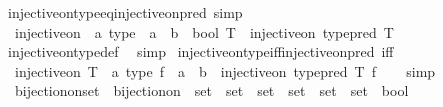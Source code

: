 \begin{isabellebody}
\isamarkupfalse%
\ injective{\isacharunderscore}{\kern0pt}on{\isacharunderscore}{\kern0pt}type{\isacharunderscore}{\kern0pt}eq{\isacharunderscore}{\kern0pt}injective{\isacharunderscore}{\kern0pt}on{\isacharunderscore}{\kern0pt}pred\ {\isacharbrackleft}{\kern0pt}simp{\isacharbrackright}{\kern0pt}{\isacharcolon}{\kern0pt}\isanewline
\ \ {\isachardoublequoteopen}{\isacharparenleft}{\kern0pt}injective{\isacharunderscore}{\kern0pt}on\ {\isacharcolon}{\kern0pt}{\isacharcolon}{\kern0pt}\ {\isacharprime}{\kern0pt}a\ type\ {\isasymRightarrow}\ {\isacharparenleft}{\kern0pt}{\isacharprime}{\kern0pt}a\ {\isasymRightarrow}\ {\isacharprime}{\kern0pt}b{\isacharparenright}{\kern0pt}\ {\isasymRightarrow}\ bool{\isacharparenright}{\kern0pt}\ T\ {\isacharequal}{\kern0pt}\ injective{\isacharunderscore}{\kern0pt}on\ {\isacharparenleft}{\kern0pt}type{\isacharunderscore}{\kern0pt}pred\ T{\isacharparenright}{\kern0pt}{\isachardoublequoteclose}\isanewline
%
\isadelimproof
\ \ %
\endisadelimproof
%
\isatagproof
{}\isamarkupfalse%
\ injective{\isacharunderscore}{\kern0pt}on{\isacharunderscore}{\kern0pt}type{\isacharunderscore}{\kern0pt}def\ \isamarkupfalse%
\ simp%
\endisatagproof
{\isafoldproof}%
%
\isadelimproof
\isanewline
%
\endisadelimproof
\isanewline
{}\isamarkupfalse%
\ injective{\isacharunderscore}{\kern0pt}on{\isacharunderscore}{\kern0pt}type{\isacharunderscore}{\kern0pt}iff{\isacharunderscore}{\kern0pt}injective{\isacharunderscore}{\kern0pt}on{\isacharunderscore}{\kern0pt}pred\ {\isacharbrackleft}{\kern0pt}iff{\isacharbrackright}{\kern0pt}{\isacharcolon}{\kern0pt}\isanewline
\ \ {\isachardoublequoteopen}injective{\isacharunderscore}{\kern0pt}on\ {\isacharparenleft}{\kern0pt}T\ {\isacharcolon}{\kern0pt}{\isacharcolon}{\kern0pt}\ {\isacharprime}{\kern0pt}a\ type{\isacharparenright}{\kern0pt}\ {\isacharparenleft}{\kern0pt}f\ {\isacharcolon}{\kern0pt}{\isacharcolon}{\kern0pt}\ {\isacharprime}{\kern0pt}a\ {\isasymRightarrow}\ {\isacharprime}{\kern0pt}b{\isacharparenright}{\kern0pt}\ {\isasymlongleftrightarrow}\ injective{\isacharunderscore}{\kern0pt}on\ {\isacharparenleft}{\kern0pt}type{\isacharunderscore}{\kern0pt}pred\ T{\isacharparenright}{\kern0pt}\ f{\isachardoublequoteclose}\isanewline
%
\isadelimproof
\ \ %
\endisadelimproof
%
\isatagproof
{}\isamarkupfalse%
\ simp%
\endisatagproof
{\isafoldproof}%
%
\isadelimproof
\isanewline
%
\endisadelimproof
\isanewline
{}\isamarkupfalse%
\isanewline
\ \ bijection{\isacharunderscore}{\kern0pt}on{\isacharunderscore}{\kern0pt}set\ {\isasymequiv}\ {\isachardoublequoteopen}bijection{\isacharunderscore}{\kern0pt}on\ {\isacharcolon}{\kern0pt}{\isacharcolon}{\kern0pt}\ set\ {\isasymRightarrow}\ set\ {\isasymRightarrow}\ {\isacharparenleft}{\kern0pt}set\ {\isasymRightarrow}\ set{\isacharparenright}{\kern0pt}\ {\isasymRightarrow}\ {\isacharparenleft}{\kern0pt}set\ {\isasymRightarrow}\ set{\isacharparenright}{\kern0pt}\ {\isasymRightarrow}\ bool{\isachardoublequoteclose}\isanewline

\end{isabellebody}
